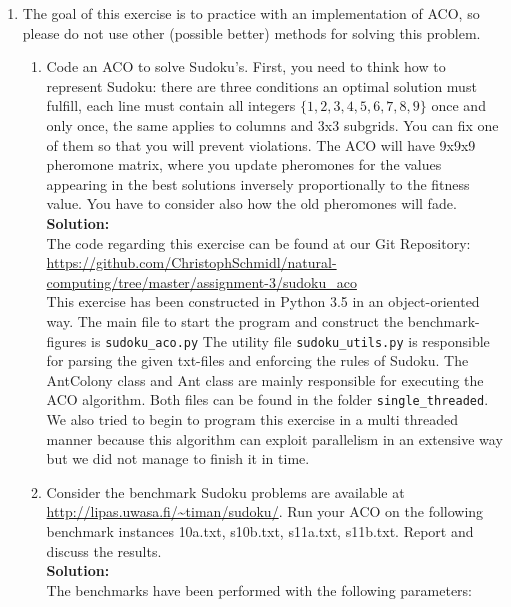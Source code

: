 \documentclass[a4paper]{article}
\begin{document}
\begin{enumerate}
	\item The goal of this exercise is to practice with an implementation of ACO, so please do not use other (possible better) methods for solving this problem.
	
	\begin{enumerate}
		\item Code an ACO to solve Sudoku's. First, you need to think how to represent Sudoku: there are three conditions an optimal solution must fulfill, each line must contain all integers $\{1,2,3,4,5,6,7,8,9 \}$ once and only once, the same applies to columns and 3x3 subgrids. You can fix one of them so that you will prevent violations. The ACO will have 9x9x9 pheromone matrix, where you update pheromones for the values appearing in the best solutions inversely proportionally to the fitness value. You have to consider also how the old pheromones will fade.\\
		\textbf{Solution:}\\
		
		The code regarding this exercise can be found at our Git Repository:\\
		\url{https://github.com/ChristophSchmidl/natural-computing/tree/master/assignment-3/sudoku_aco}\\
	
	    This exercise has been constructed in Python 3.5 in an object-oriented way. The main file to start the program and construct the benchmark-figures is \texttt{sudoku\_aco.py} The utility file \texttt{sudoku\_utils.py} is responsible for parsing the given txt-files and enforcing the rules of Sudoku. The AntColony class and Ant class are mainly responsible for executing the ACO algorithm. Both files can be found in the folder \texttt{single\_threaded}. We also tried to begin to program this exercise in a multi threaded manner because this algorithm can exploit parallelism in an extensive way but we did not manage to finish it in time.\\
		
		
		\item Consider the benchmark Sudoku problems are available at \url{http://lipas.uwasa.fi/~timan/sudoku/}. Run your ACO on the following benchmark instances \textsf{10a.txt, s10b.txt, s11a.txt, s11b.txt}. Report and discuss the results.\\
		 \textbf{Solution:}\\
		
		The benchmarks have been performed with the following parameters:
		

\end{enumerate}
\end{enumerate}
\end{document}
